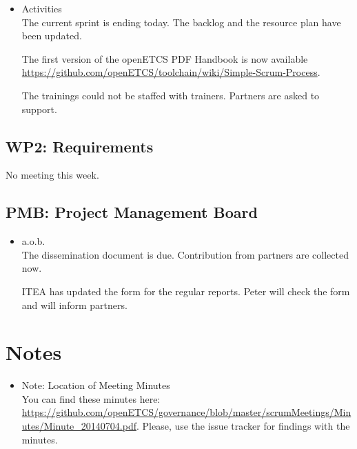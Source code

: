 \documentclass[a4paper, 11pt]{article}
\begin{document}
\begin{itemize}
\item Activities\\
The current sprint is ending today. 
The backlog and the resource plan have been updated.

The first version of the openETCS PDF Handbook is now available \url{https://github.com/openETCS/toolchain/wiki/Simple-Scrum-Process}.

The trainings could not be staffed with trainers. Partners are asked to support.
\end{itemize}

\subsection{WP2: Requirements}


No meeting this week.


\subsection{PMB: Project Management Board}
\begin{itemize}
\item a.o.b.\\
The dissemination document is due. Contribution from partners are collected now.

ITEA has updated the form for the regular reports. Peter will check the form and will inform partners.

\end{itemize}

\section{Notes}
\begin{itemize}

\item Note: Location of Meeting Minutes\\
You can find these minutes here: \url{https://github.com/openETCS/governance/blob/master/scrumMeetings/Minutes/Minute_20140704.pdf}. Please, use the issue tracker for findings with the minutes.

\end{itemize}
\end{document}
